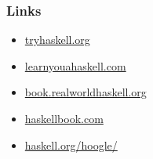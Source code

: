 \documentclass[17pt]{beamer}
\renewcommand{\(}[1]{\begin{columns}[#1]}
\renewcommand{\)}{\end{columns}}
\newcommand{\<}[1]{\begin{column}{#1}}
\renewcommand{\>}{\end{column}}
\begin{document}
\begin{frame}
  \frametitle{Links}
  \begin{itemize}
  \item \href{https://tryhaskell.org}{tryhaskell.org}
  \item \href{https://learnyouahaskell.com}{learnyouahaskell.com}
  \item \href{https://book.realworldhaskell.org}{book.realworldhaskell.org}
  \item \href{http://haskellbook.com}{haskellbook.com}
  \item \href{https://www.haskell.org/hoogle/}{haskell.org/hoogle/}
  \end{itemize}
\end{frame}



\end{document}
